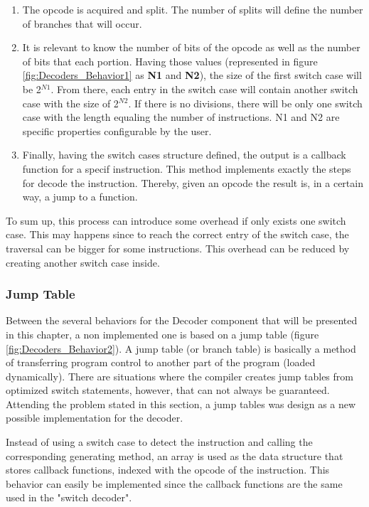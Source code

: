     \begin{enumerate}
    
   		\item The opcode is acquired and split. The number of splits will define the number of branches that will occur.
        
        \item It is relevant to know the number of bits of the opcode as well as the number of bits that each portion. Having those values (represented in figure \ref{fig:Decoders_Behavior1} as \textbf{N1} and \textbf{N2}), the size of the first switch case will be 2$^{N1}$. From there, each entry in the switch case will contain another switch case with the size of 2$^{N2}$. If there is no divisions, there will be only one switch case with the length equaling the number of instructions. N1 and N2 are specific properties configurable by the user.

		\item Finally, having the switch cases structure defined, the output is a callback function for a specif instruction. This method implements exactly the steps for decode the instruction. Thereby, given an opcode the result is, in a certain way, a jump to a function.
	\end{enumerate}
    
    To sum up, this process can introduce some overhead if only exists one switch case. This may happens since to reach the correct entry of the switch case, the traversal can be bigger for some instructions. This overhead can be reduced by creating another switch case inside. 

   
\subsubsection{Jump Table}

Between the several behaviors for the Decoder component that will be presented in this chapter, a non implemented one is based on a jump table (figure \ref{fig:Decoders_Behavior2}). A jump table (or branch table) is basically a method of transferring program control to another part of the program (loaded dynamically). There are situations where the compiler creates jump tables from optimized switch statements, however, that can not always be guaranteed. Attending the problem stated in this section, a jump tables was design as a new possible implementation for the decoder. 

Instead of using a switch case to detect the instruction and calling the corresponding generating method, an array is used as the data structure that stores callback functions, indexed with the opcode of the instruction. This behavior can easily be implemented since the callback functions are the same used in the "switch decoder". 

